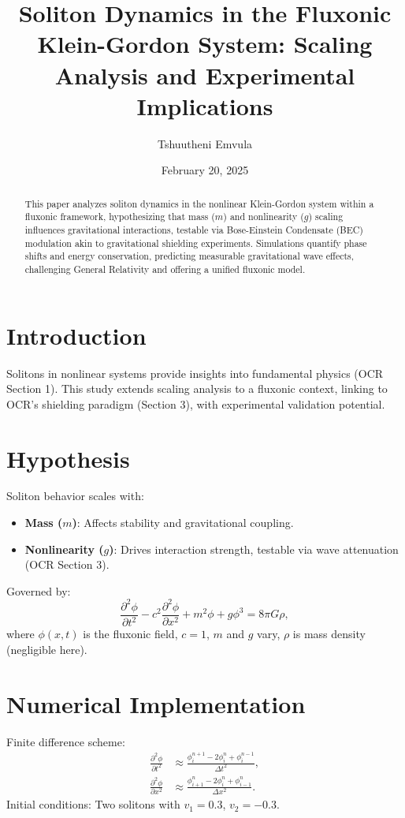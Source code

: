 \documentclass{article}
\title{Soliton Dynamics in the Fluxonic Klein-Gordon System: Scaling Analysis and Experimental Implications}
\author{Tshuutheni Emvula}
\date{February 20, 2025}
\begin{document}
\maketitle

\begin{abstract}
This paper analyzes soliton dynamics in the nonlinear Klein-Gordon system within a fluxonic framework, hypothesizing that mass (\(m\)) and nonlinearity (\(g\)) scaling influences gravitational interactions, testable via Bose-Einstein Condensate (BEC) modulation akin to gravitational shielding experiments. Simulations quantify phase shifts and energy conservation, predicting measurable gravitational wave effects, challenging General Relativity and offering a unified fluxonic model.
\end{abstract}

\section{Introduction}
Solitons in nonlinear systems provide insights into fundamental physics (OCR Section 1). This study extends scaling analysis to a fluxonic context, linking to OCR’s shielding paradigm (Section 3), with experimental validation potential.

\section{Hypothesis}
Soliton behavior scales with:
\begin{itemize}
    \item \textbf{Mass (\(m\))}: Affects stability and gravitational coupling.
    \item \textbf{Nonlinearity (\(g\))}: Drives interaction strength, testable via wave attenuation (OCR Section 3).
\end{itemize}
Governed by:
\begin{equation}
\frac{\partial^2 \phi}{\partial t^2} - c^2 \frac{\partial^2 \phi}{\partial x^2} + m^2 \phi + g \phi^3 = 8 \pi G \rho,
\end{equation}
where \(\phi(x,t)\) is the fluxonic field, \(c = 1\), \(m\) and \(g\) vary, \(\rho\) is mass density (negligible here).

\section{Numerical Implementation}
Finite difference scheme:
\begin{align}
\frac{\partial^2 \phi}{\partial t^2} &\approx \frac{\phi^{n+1}_i - 2\phi^n_i + \phi^{n-1}_i}{\Delta t^2}, \\
\frac{\partial^2 \phi}{\partial x^2} &\approx \frac{\phi^n_{i+1} - 2\phi^n_i + \phi^n_{i-1}}{\Delta x^2}.
\end{align}
Initial conditions: Two solitons with \(v_1 = 0.3\), \(v_2 = -0.3\).
\end{document}
